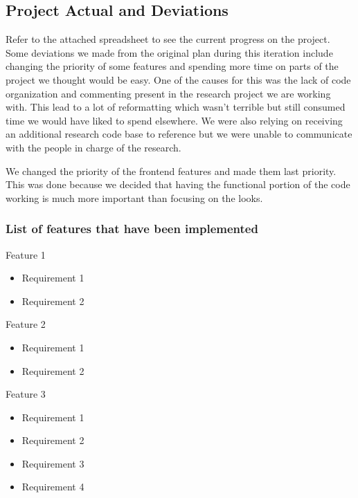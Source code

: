 \documentclass[11pt,]{article}
\providecommand{\tightlist}{%
  \setlength{\itemsep}{0pt}\setlength{\parskip}{0pt}}
\begin{document}
\hypertarget{project-actual-and-deviations}{%
\subsection{Project Actual and
Deviations}\label{project-actual-and-deviations}}

Refer to the attached spreadsheet to see the current progress on the
project. Some deviations we made from the original plan during this
iteration include changing the priority of some features and spending
more time on parts of the project we thought would be easy. One of the
causes for this was the lack of code organization and commenting present
in the research project we are working with. This lead to a lot of
reformatting which wasn't terrible but still consumed time we would have
liked to spend elsewhere. We were also relying on receiving an
additional research code base to reference but we were unable to
communicate with the people in charge of the research.

We changed the priority of the frontend features and made them last
priority. This was done because we decided that having the functional
portion of the code working is much more important than focusing on the
looks.

\hypertarget{list-of-features-that-have-been-implemented}{%
\subsubsection{List of features that have been
implemented}\label{list-of-features-that-have-been-implemented}}

Feature 1

\begin{itemize}
\tightlist
\item
  Requirement 1
\item
  Requirement 2
\end{itemize}

Feature 2

\begin{itemize}
\tightlist
\item
  Requirement 1
\item
  Requirement 2
\end{itemize}

Feature 3

\begin{itemize}
\tightlist
\item
  Requirement 1
\item
  Requirement 2
\item
  Requirement 3
\item
  Requirement 4
\end{itemize}
\end{document}
